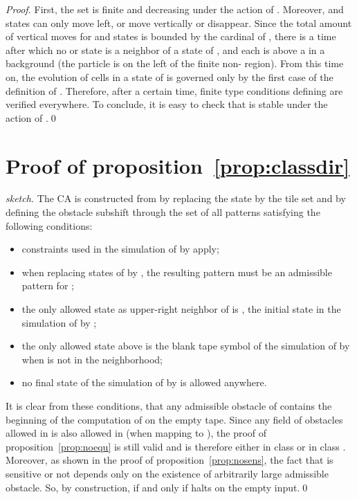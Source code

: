 \documentclass{llncs}
\begin{document}
\begin{proof}
  First, the set  is finite and
  decreasing under the action of . Moreover,  and  states
  can only move left, or move vertically or disappear. Since the total
  amount of vertical moves for  and  states is bounded by the
  cardinal of , there is a time 
  after which no  or  state is a neighbor of a state of
  , and each  is above a  in a  background (the
   particle is on the left of the finite non- region).  From
  this time on, the evolution of cells in a state of  is
  governed only by the first case of the definition of
  . Therefore, after a certain time, finite type conditions
  defining  are verified everywhere. To conclude, it is easy to
  check that  is stable under the action of .\qed
\end{proof}

\section{Proof of proposition~\ref{prop:classdir}}



\begin{proof}[sketch]
  The CA  is constructed from  by replacing the
  state  by the tile set  and by defining the obstacle
  subshift  through the set of all
   patterns satisfying the following conditions:
  \begin{itemize}
  \item constraints used in the simulation of  by  apply;
  \item when replacing states of  by , the resulting
    pattern must be an admissible pattern for ;
  \item the only allowed state as upper-right neighbor of  is
    , the initial state in the simulation of  by
    ;
  \item the only allowed state above  is the blank tape symbol of
    the simulation of  by  when  is
    not in the neighborhood;
  \item no final state of the simulation of  by
     is allowed anywhere.
  \end{itemize}
  It is clear from these conditions, that any admissible obstacle of
   contains the beginning of the
  computation of  on the empty tape.  Since any field of
  obstacles allowed in  is also allowed in
   (when mapping  to ), the proof of
  proposition~\ref{prop:noequ} is still valid and  is
  therefore either in class  or in class . Moreover, as
  shown in the proof of proposition~\ref{prop:nosens}, the fact that
   is sensitive or not depends only on the existence
  of arbitrarily large admissible obstacle. So, by construction,
   if and only if  halts on the
  empty input.\qed
\end{proof}
\end{document}
